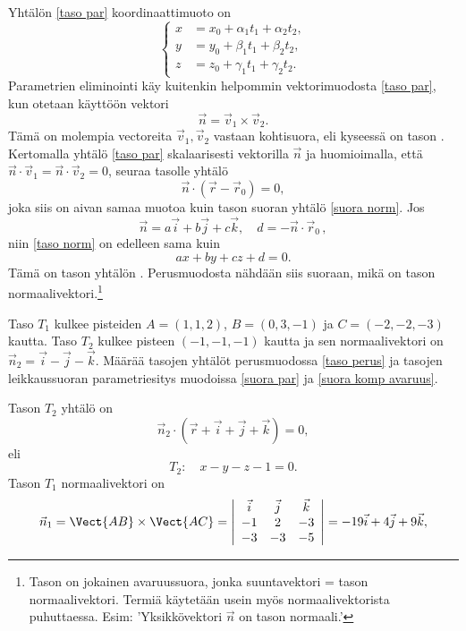 Yhtälön \eqref{taso par} koordinaattimuoto on
\[
\left\{ \begin{array}{lll}
x &= x_0 + \alpha_1 t_1 + \alpha_2 t_2, \\
y &= y_0 + \beta_1 t_1 + \beta_2 t_2,   \\
z &= z_0 + \gamma_1 t_1 + \gamma_2 t_2.
\end{array} \right.
\]
Parametrien eliminointi käy kuitenkin helpommin vektorimuodosta \eqref{taso par}, kun otetaan 
käyttöön vektori
\[
\vec n = \vec v_1 \times \vec v_2.
\]
Tämä on molempia vectoreita $\vec v_1, \vec v_2$ vastaan kohtisuora, eli kyseessä on
tason
%
. Kertomalla yhtälö \eqref{taso par} skalaarisesti vektorilla
$\vec n$ ja huomioimalla, että $\vec n \cdot \vec v_1 = \vec n \cdot \vec v_2 = 0$, seuraa
tasolle yhtälö
\begin{equation} \label{taso norm}
\vec n \cdot (\vec r - \vec r_0)=0,
\end{equation}
joka siis on aivan samaa muotoa kuin tason suoran yhtälö \eqref{suora norm}. Jos
\[
\vec n = a\vec i + b \vec j + c\vec k, \quad d=-\vec n \cdot \vec r_0\,,
\]
niin \eqref{taso norm} on edelleen sama kuin
\begin{equation} \label{taso perus}
ax+by+cz+d=0.
\end{equation}
%
Tämä on tason yhtälön . Perusmuodosta nähdään siis suoraan, mikä on tason
normaalivektori.\footnote[2]{Tason  on jokainen avaruussuora, jonka suuntavektori
= tason normaalivektori. Termiä käytetään usein myös normaalivektorista puhuttaessa. Esim:
'Yksikkövektori $\vec n$ on tason normaali.'}
\begin{Exa}
Taso $T_1$ kulkee pisteiden $A=(1,1,2)$, $B=(0,3,-1)$ ja $C=(-2,-2,-3)$ kautta. Taso $T_2$ 
kulkee pisteen $(-1,-1,-1)$ kautta ja sen normaalivektori on 
$\vec n_2 = \vec i - \vec j - \vec k$. Määrää tasojen yhtälöt perusmuodossa \eqref{taso perus}
ja tasojen leikkaussuoran parametriesitys muodoissa \eqref{suora par} ja
\eqref{suora komp avaruus}.
\end{Exa}
\ratk Tason $T_2$ yhtälö on
\[
\vec n_2 \cdot (\vec r + \vec i + \vec j + \vec k) = 0,
\]
eli
\[
T_2: \quad x-y-z-1=0.
\]
Tason $T_1$ normaalivektori on
\[
\vec n_1 = \Vect{AB} \times \Vect{AC} =
\left| \begin{array}{ccc}
\vec i & \vec j & \vec k \\
-1 & 2 & -3 \\
-3 & -3 & -5
\end{array} \right| =
-19\vec i + 4\vec j + 9\vec k,
\]
